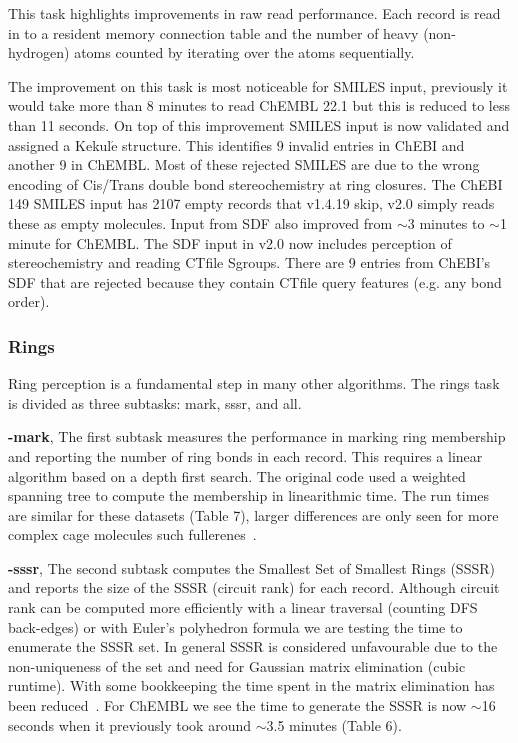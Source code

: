 \documentclass[doublespacing]{bmcart}
\def \cdkversion {v2.0}
\begin{document}
This task highlights improvements in raw read performance. Each record is read
in to a resident memory connection table and the number of heavy (non-hydrogen)
atoms counted by iterating over the atoms sequentially.

The improvement on this task is most noticeable for SMILES input, previously
it would take more than 8 minutes to read ChEMBL 22.1 but this is reduced
to less than 11 seconds. On top of this improvement SMILES input is now validated 
and assigned a Kekul$\mathrm{\acute{e}}$ structure. This identifies 9 invalid
entries in ChEBI and another 9 in ChEMBL. Most of these rejected SMILES
are due to the wrong encoding of Cis/Trans double bond stereochemistry at ring 
closures. The ChEBI 149 SMILES input has 2107 empty records that v1.4.19 skip,
\cdkversion{} simply reads these as empty molecules. Input from SDF also 
improved from $\sim$3 minutes to $\sim$1 minute for ChEMBL. The SDF input in
\cdkversion{} now includes perception of stereochemistry and reading CTfile 
Sgroups. There are 9 entries from ChEBI's SDF that are rejected because they 
contain CTfile query features (e.g. any bond order).

\subsubsection*{Rings}

Ring perception is a fundamental step in many other algorithms. 
The rings task is divided as three subtasks: mark, sssr, and all.

\textbf{-mark}, The first subtask measures the performance in marking 
ring membership and reporting the number of ring bonds in each record.
This requires a linear algorithm based on a depth first search. 
The original code used a weighted spanning tree to compute the membership in 
linearithmic time. The run times are similar for these datasets (Table
7), larger differences are only seen for more complex cage molecules such 
fullerenes~\cite{May2014}.

\textbf{-sssr}, The second subtask computes the Smallest Set of Smallest Rings 
(SSSR) and reports the size of the SSSR (circuit rank) for each record. Although 
circuit rank can be computed more efficiently 
with a linear traversal (counting DFS back-edges) or with Euler's 
polyhedron formula we are testing the time to enumerate the SSSR set. In general
SSSR is considered unfavourable due to the 
non-uniqueness of the set and need for Gaussian matrix elimination (cubic 
runtime). With some bookkeeping the time spent in the matrix elimination has been
reduced~\cite{May2014}. For ChEMBL we see the time to generate the SSSR is now
$\sim$16 seconds when it previously took around $\sim$3.5 minutes (Table 6).
\end{document}
